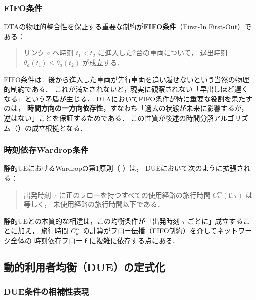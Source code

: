 \subsubsection*{FIFO条件}

DTAの物理的整合性を保証する重要な制約が\textbf{FIFO条件}（First-In First-Out）である：

\begin{quotation}
  \noindent
  リンク $a$ へ時刻 $t_1 < t_2$ に進入した2台の車両について，
  退出時刻 $\theta_a(t_1) \leq \theta_a(t_2)$ が成立する．
\end{quotation}

FIFO条件は，後から進入した車両が先行車両を追い越せないという当然の物理的制約である．
これが満たされないと，現実に観察されない「早出しほど遅くなる」という矛盾が生じる．
DTAにおいてFIFO条件が特に重要な役割を果たすのは，
\textbf{時間方向の一方向依存性}，すなわち「過去の状態が未来に影響するが，逆はない」ことを保証するためである．
この性質が後述の時間分解アルゴリズム（）の成立根拠となる．

\subsubsection*{時刻依存Wardrop条件}

静的UEにおけるWardropの第1原則（ ）は，
DUEにおいて次のように拡張される：

\begin{quotation}
  \noindent
  出発時刻 $\tau$ に正のフローを持つすべての使用経路の旅行時間
  $C_k^{rs}(\boldsymbol{f}, \tau)$ は等しく，
  未使用経路の旅行時間以下である．
\end{quotation}

静的UEとの本質的な相違は，この均衡条件が「出発時刻 $\tau$ ごとに」成立することに加え，
旅行時間 $C_k^{rs}$ の計算がフロー伝播（FIFO制約）を介してネットワーク全体の
時刻依存フロー $\boldsymbol{f}$ に複雑に依存する点にある．

\subsection{動的利用者均衡（DUE）の定式化}
\label{subsec:due-formulation}

\subsubsection*{DUE条件の相補性表現}

